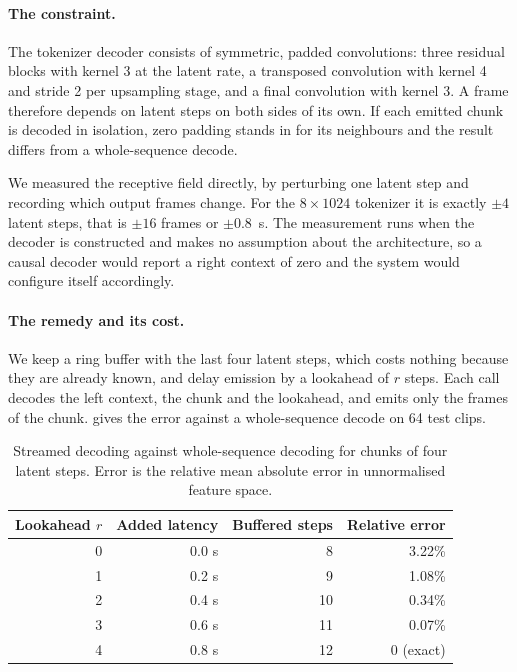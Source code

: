 \paragraph{The constraint.} The tokenizer decoder consists of symmetric, padded convolutions: three residual blocks with kernel 3 at the latent rate, a transposed convolution with kernel 4 and stride 2 per upsampling stage, and a final convolution with kernel 3. A frame therefore depends on latent steps on both sides of its own. If each emitted chunk is decoded in isolation, zero padding stands in for its neighbours and the result differs from a whole-sequence decode.

We measured the receptive field directly, by perturbing one latent step and recording which output frames change. For the $8 \times 1024$ tokenizer it is exactly $\pm 4$ latent steps, that is $\pm 16$ frames or $\pm 0.8$~s. The measurement runs when the decoder is constructed and makes no assumption about the architecture, so a causal decoder would report a right context of zero and the system would configure itself accordingly.

\paragraph{The remedy and its cost.} We keep a ring buffer with the last four latent steps, which costs nothing because they are already known, and delay emission by a lookahead of $r$ steps. Each call decodes the left context, the chunk and the lookahead, and emits only the frames of the chunk.  gives the error against a whole-sequence decode on 64 test clips.

\begin{table}[H]
\centering
\caption{Streamed decoding against whole-sequence decoding for chunks of four latent steps. Error is the relative mean absolute error in unnormalised feature space.}
\label{tab:lookahead}
\begin{tabular}{rrrr}
\toprule
Lookahead $r$ & Added latency & Buffered steps & Relative error \\
\midrule
0 & 0.0 s & 8 & 3.22\% \\
1 & 0.2 s & 9 & 1.08\% \\
2 & 0.4 s & 10 & 0.34\% \\
3 & 0.6 s & 11 & 0.07\% \\
4 & 0.8 s & 12 & 0 (exact) \\
\bottomrule
\end{tabular}
\end{table}

